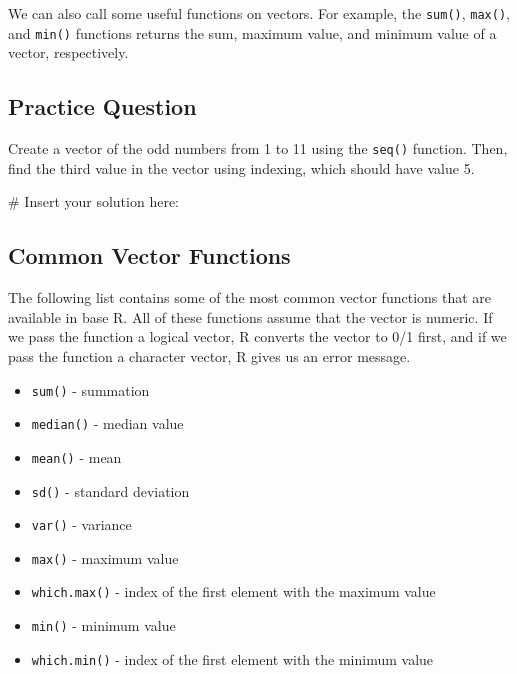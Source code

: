 \documentclass[
  letterpaper,
]{latex/krantz}
\makeatletter
\newenvironment{Shaded}{\begin{snugshade}}{\end{snugshade}}
\newcommand{\CommentTok}[1]{\textcolor[rgb]{0.37,0.37,0.37}{#1}}
\providecommand{\tightlist}{%
  \setlength{\itemsep}{0pt}\setlength{\parskip}{0pt}}\usepackage{longtable,booktabs,array}
\newenvironment{kframe}{%
\medskip{}
\setlength{\fboxsep}{.8em}
 \def\at@end@of@kframe{}%
 \ifinner\ifhmode%
  \def\at@end@of@kframe{\end{minipage}}%
  \begin{minipage}{\columnwidth}%
 \fi\fi%
 \def\FrameCommand##1{\hskip\@totalleftmargin \hskip-\fboxsep
 \colorbox{shadecolor}{##1}\hskip-\fboxsep
     \hskip-\linewidth \hskip-\@totalleftmargin \hskip\columnwidth}%
 \MakeFramed {\advance\hsize-\width
   \@totalleftmargin\z@ \linewidth\hsize
   \@setminipage}}%
 {\par\unskip\endMakeFramed%
 \at@end@of@kframe}
\renewenvironment{Shaded}{\begin{kframe}}{\end{kframe}}
\makeatother
\begin{document}
We can also call some useful functions on vectors. For example, the
\texttt{sum()}, \texttt{max()},
and \texttt{min()} functions
returns the sum, maximum value, and minimum value of a vector,
respectively.

\subsection{Practice Question}\label{practice-question}

Create a vector of the odd numbers from 1 to 11 using the \texttt{seq()}
function. Then, find the third value in the vector using indexing, which
should have value 5.

\begin{Shaded}
\begin{Highlighting}[]
\CommentTok{\# Insert your solution here:}
\end{Highlighting}
\end{Shaded}

\subsection{\texorpdfstring{Common Vector Functions
}{Common Vector Functions }}\label{common-vector-functions}

The following list contains some of the most common vector functions
that are available in base R. All of these functions assume that the
vector is numeric. If we pass the function a logical vector, R converts
the vector to 0/1 first, and if we pass the function a character vector,
R gives us an error message.

\begin{itemize}
\tightlist
\item
  \texttt{sum()} - summation 
\item
  \texttt{median()} - median value
\item
  \texttt{mean()} - mean 
\item
  \texttt{sd()} - standard deviation
\item
  \texttt{var()} - variance 
\item
  \texttt{max()} - maximum value
\item
  \texttt{which.max()} - index of the first element with the maximum
  value 
\item
  \texttt{min()} - minimum value
\item
  \texttt{which.min()} - index of the first element with the minimum
  value 
\end{itemize}
\end{document}
